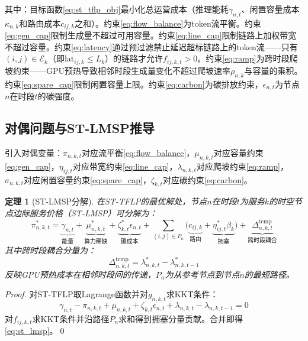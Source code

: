 \documentclass[11pt,a4paper,twocolumn]{article}
\newtheorem{theorem}{定理}[section]
\begin{document}
其中：目标函数\eqref{eq:st_tflp_obj}最小化总运营成本（推理能耗$\gamma_{n,t}$、闲置容量成本$\kappa_{n,k}$和路由成本$c_{ij,k}$之和）。约束\eqref{eq:flow_balance}为token流平衡。约束\eqref{eq:gen_cap}限制生成量不超过可用容量。约束\eqref{eq:line_cap}限制链路上加权带宽不超过容量。约束\eqref{eq:latency}通过预过滤禁止延迟超标链路上的token流——只有$(i,j) \in \mathcal{E}_k$（即$\text{lat}_{ij,k} \leq L_k$）的链路才允许$f_{ij,k,t} > 0$。约束\eqref{eq:ramp}为跨时段爬坡约束——GPU预热导致相邻时段生成量变化不超过爬坡速率$\rho_{n,k}$与容量的乘积。约束\eqref{eq:spare_cap}限制闲置容量上限。约束\eqref{eq:carbon}为碳排放约束，$\epsilon_{n,t}$为节点$n$在时段$t$的碳强度。

\subsection{对偶问题与ST-LMSP推导}

引入对偶变量：$\pi_{n,k,t}$对应流平衡\eqref{eq:flow_balance}，$\mu_{n,k,t}$对应容量约束\eqref{eq:gen_cap}，$\eta_{ij,t}$对应带宽约束\eqref{eq:line_cap}，$\lambda_{n,k,t}$对应爬坡约束\eqref{eq:ramp}，$\sigma_{n,k,t}$对应闲置容量约束\eqref{eq:spare_cap}，$\zeta_{k,t}$对应碳约束\eqref{eq:carbon}。

\begin{theorem}[ST-LMSP分解]
\label{thm:st_lmsp}
在ST-TFLP的最优解处，节点$n$在时段$t$为服务$k$的时空节点边际服务价格（ST-LMSP）可分解为：
\begin{equation}
\pi_{n,k,t}^* = \underbrace{\gamma_{n,t}}_{\text{能量}} + \underbrace{\mu_{n,k,t}^*}_{\text{算力稀缺}} + \underbrace{\zeta_{k,t}^* \epsilon_{n,t}}_{\text{碳成本}} + \sum_{(i,j) \in P_n} \bigl(\underbrace{c_{ij,k}}_{\text{路由}} + \underbrace{\eta_{ij,t}^* \beta_k}_{\text{拥塞}}\bigr) + \underbrace{\Delta_{n,k,t}^{\text{temp}}}_{\text{跨时段耦合}}
\label{eq:st_lmsp}
\end{equation}
其中跨时段耦合分量为：
\begin{equation}
\Delta_{n,k,t}^{\text{temp}} = \lambda_{n,k,t}^* - \lambda_{n,k,t-1}^*
\label{eq:temp_coupling}
\end{equation}
反映GPU预热成本在相邻时段间的传递，$P_n$为从参考节点到节点$n$的最短路径。
\end{theorem}

\begin{proof}
对ST-TFLP取Lagrange函数并对$g_{n,k,t}$求KKT条件：
\begin{equation}
\gamma_{n,t} - \pi_{n,k,t} + \mu_{n,k,t} + \zeta_{k,t}\epsilon_{n,t} + \lambda_{n,k,t} - \lambda_{n,k,t-1} = 0
\label{eq:kkt_g}
\end{equation}
对$f_{ij,k,t}$求KKT条件并沿路径$P_n$求和得到拥塞分量贡献。合并即得\eqref{eq:st_lmsp}。\qed
\end{proof}
\end{document}
